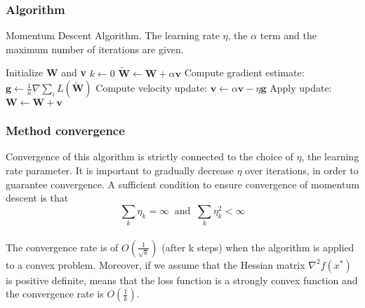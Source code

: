 \subsubsection{Algorithm}
\begin{algorithm}[H]
	\caption{Momentum Descent Algorithm. The learning rate $\eta$, the $\alpha$ term and the maximum number of iterations are given.}
	\label{alg:sgd}
	\begin{algorithmic}[1]
		\State Initialize \textbf{W} and \textbf{v}
		\State $k \gets 0$
		\State $\tilde{\textbf{W}} \gets \textbf{W} + \alpha \textbf{v}$
		\EndIf
		\State Compute gradient estimate: $\textbf{g} \gets \frac {1}{n} \nabla \sum_i\textit{L}(\tilde{\textbf{W}})$
		\State Compute velocity update: $\textbf{v} \gets \alpha \textbf{v} - \eta \textbf{g}$
		\State Apply update: $\textbf{W} \gets \textbf{W} + \textbf{v}$
		\EndWhile
		\EndProcedure
	\end{algorithmic}
\end{algorithm}

\subsubsection{Method convergence}
Convergence of this algorithm is strictly connected to the choice of $\eta$, the learning rate parameter. It is important to gradually decrease $\eta$ over iterations, in order to guarantee convergence. A sufficient condition to ensure convergence of momentum descent is that 
\begin{equation}
\label{assumption:momentum_descent}
\sum_k \eta_k=\infty \  \text{ and } \ \sum_k \eta_k^2 < \infty
\end{equation}
\\
The convergence rate is of $O(\frac{1}{\sqrt{k}})$ (after k steps) when the algorithm is applied to a convex problem. 
Moreover, if we assume that the Hessian matrix $\nabla^2f(x^*)$ is positive definite, means that the loss function is a strongly convex function and the convergence rate is $O(\frac{1}{k})$. \cite{goodfellow}


